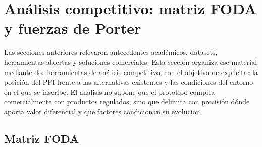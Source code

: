 \section{Análisis competitivo: matriz FODA y fuerzas de Porter}

Las secciones anteriores relevaron antecedentes académicos, datasets, herramientas abiertas y soluciones comerciales. Esta sección organiza ese material mediante dos herramientas de análisis competitivo, con el objetivo de explicitar la posición del PFI frente a las alternativas existentes y las condiciones del entorno en el que se inscribe. El análisis no supone que el prototipo compita comercialmente con productos regulados, sino que delimita con precisión dónde aporta valor diferencial y qué factores condicionan su evolución.

\subsection{Matriz FODA}

